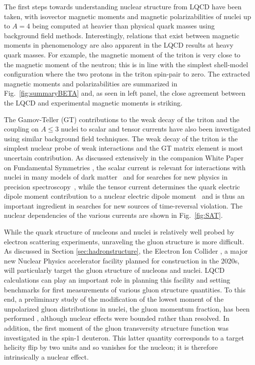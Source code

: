 The first steps towards understanding nuclear structure from LQCD have been taken, with isovector magnetic moments \cite{Beane:2014ora,Beane:2015yha,Detmold:2015daa} and magnetic  polarizabilities \cite{Chang:2015qxa} of nuclei up to $A=4$ being computed at heavier than physical quark masses using background field methods. Interestingly, relations that exist between magnetic moments in phenomenology are also apparent in the LQCD results at heavy quark masses. For example,  the magnetic moment of the triton is very close to the magnetic moment of the neutron; this is in line with the simplest shell-model configuration where the two protons in the triton spin-pair to zero. The extracted magnetic moments and polarizabilities are summarized in Fig.~\ref{fig:summaryBETA} and, as seen in left panel, the close agreement between the LQCD  and experimental magnetic moments is striking.

The Gamov-Teller (GT) contributions to the weak decay of the triton \cite{Savage:2016kon} and the coupling on $A\le3$ nuclei to scalar and tensor currents \cite{Chang:2017eiq} have also been investigated using similar background field techniques. The weak decay of the triton is the simplest nuclear probe of weak interactions and the GT matrix element is most uncertain contribution. 
As discussed extensively in the companion White Paper on Fundamental Symmetries \cite{Cirigliano:2019jig}, the scalar current is relevant for interactions with nuclei in many models of dark matter~\cite{Undagoitia:2015gya} and for searches for new physics in precision spectroscopy~\cite{Delaunay:2016brc,Delaunay:2017dku}, while the tensor current determines 
the quark electric dipole moment contribution to a nuclear electric dipole moment~\cite{Engel:2013lsa,Yamanaka:2016umw,Chupp:2017rkp} and is thus an important ingredient in searches for new sources of time-reversal violation. 
 The nuclear dependencies of the various currents are shown in Fig.~\ref{fig:SAT}.


While the quark structure of nucleons and nuclei is relatively well probed by electron scattering experiments, unraveling the gluon structure is  more difficult. As discussed in Section \ref{sec:hadronstructure}, the Electron Ion Collider \cite{Accardi:2012qut}, a major new Nuclear Physics accelerator facility planned for construction in the 2020s, will particularly target the gluon structure of nucleons and nuclei. LQCD calculations can play an important role in planning this facility and setting benchmarks for first measurements of various gluon structure quantities. To this end, a preliminary study of the modification of the lowest moment of the unpolarized  gluon distributions in nuclei, the gluon momentum fraction, has been performed \cite{Winter:2017bfs}, although nuclear effects were bounded rather than resolved.   In addition, the first moment of the gluon transversity structure function was investigated in the spin-1 deuteron. This latter  quantity  corresponds to a target helicity flip by two units and so vanishes for the nucleon; it is therefore intrinsically a nuclear effect.


